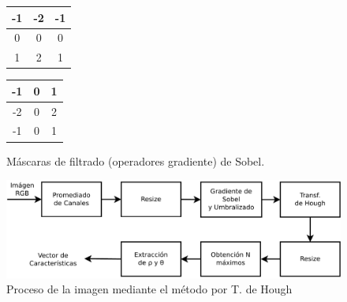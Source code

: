 \documentclass[conference,spanish,a4paper,10pt,oneside,final]{tfmpd}
\begin{document}
\begin{figure}
\begin{center}
\begin{tabular}{|c|c|c|}
\hline -1 & -2 & -1 \\\hline 0 & 0 & 0 \\\hline 1 & 2 & 1 \\\hline
\end{tabular}
\begin{tabular}{|c|c|c|}
\hline -1 & 0 & 1 \\\hline -2 & 0 & 2 \\\hline -1 & 0 & 1 \\\hline
\end{tabular}
\end{center}
\caption{Máscaras de filtrado (operadores gradiente) de Sobel.}
\label{masksobel}
\end{figure}
\begin{figure}
\begin{center}
\includegraphics[scale=0.25]{../diagramas/procesohough} 
\end{center}
\caption{Proceso de la imagen mediante el método por T. de Hough}
\label{procesohough}
\end{figure}
%
%
\end{document}
